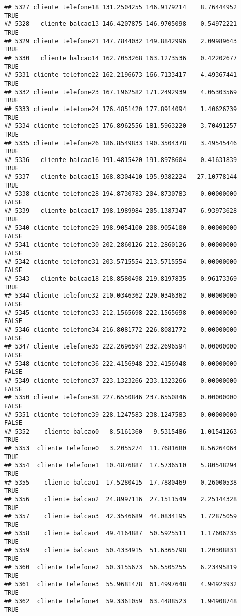 \documentclass[
]{article}
\begin{document}
\begin{verbatim}
## 5327 cliente telefone18 131.2504255 146.9179214    8.76444952     TRUE
## 5328   cliente balcao13 146.4207875 146.9705098    0.54972221     TRUE
## 5329 cliente telefone21 147.7844032 149.8842996    2.09989643     TRUE
## 5330   cliente balcao14 162.7053268 163.1273536    0.42202677     TRUE
## 5331 cliente telefone22 162.2196673 166.7133417    4.49367441     TRUE
## 5332 cliente telefone23 167.1962582 171.2492939    4.05303569     TRUE
## 5333 cliente telefone24 176.4851420 177.8914094    1.40626739     TRUE
## 5334 cliente telefone25 176.8962556 181.5963220    3.70491257     TRUE
## 5335 cliente telefone26 186.8549833 190.3504378    3.49545446     TRUE
## 5336   cliente balcao16 191.4815420 191.8978604    0.41631839     TRUE
## 5337   cliente balcao15 168.8304410 195.9382224   27.10778144     TRUE
## 5338 cliente telefone28 194.8730783 204.8730783    0.00000000    FALSE
## 5339   cliente balcao17 198.1989984 205.1387347    6.93973628     TRUE
## 5340 cliente telefone29 198.9054100 208.9054100    0.00000000    FALSE
## 5341 cliente telefone30 202.2860126 212.2860126    0.00000000    FALSE
## 5342 cliente telefone31 203.5715554 213.5715554    0.00000000    FALSE
## 5343   cliente balcao18 218.8580498 219.8197835    0.96173369     TRUE
## 5344 cliente telefone32 210.0346362 220.0346362    0.00000000    FALSE
## 5345 cliente telefone33 212.1565698 222.1565698    0.00000000    FALSE
## 5346 cliente telefone34 216.8081772 226.8081772    0.00000000    FALSE
## 5347 cliente telefone35 222.2696594 232.2696594    0.00000000    FALSE
## 5348 cliente telefone36 222.4156948 232.4156948    0.00000000    FALSE
## 5349 cliente telefone37 223.1323266 233.1323266    0.00000000    FALSE
## 5350 cliente telefone38 227.6550846 237.6550846    0.00000000    FALSE
## 5351 cliente telefone39 228.1247583 238.1247583    0.00000000    FALSE
## 5352    cliente balcao0   8.5161360   9.5315486    1.01541263     TRUE
## 5353  cliente telefone0   3.2055274  11.7681680    8.56264064     TRUE
## 5354  cliente telefone1  10.4876887  17.5736510    5.80548294     TRUE
## 5355    cliente balcao1  17.5280415  17.7880469    0.26000538     TRUE
## 5356    cliente balcao2  24.8997116  27.1511549    2.25144328     TRUE
## 5357    cliente balcao3  42.3546689  44.0834195    1.72875059     TRUE
## 5358    cliente balcao4  49.4164887  50.5925511    1.17606235     TRUE
## 5359    cliente balcao5  50.4334915  51.6365798    1.20308831     TRUE
## 5360  cliente telefone2  50.3155673  56.5505255    6.23495819     TRUE
## 5361  cliente telefone3  55.9681478  61.4997648    4.94923932     TRUE
## 5362  cliente telefone4  59.3361059  63.4488523    1.94908748     TRUE

\end{verbatim}
\end{document}
